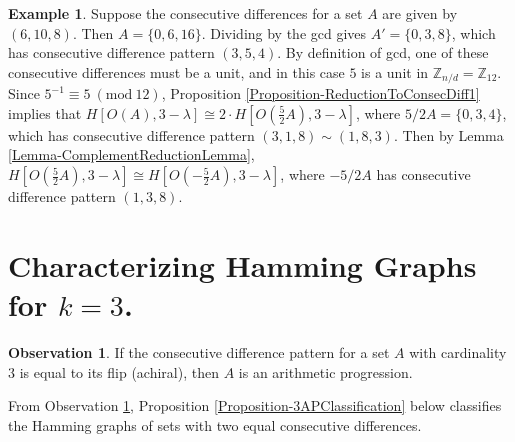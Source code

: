 \documentclass[12pt]{article}
\newcommand{\Z}{\mathbb{Z}}
\newcommand{\Mod}[1]{\ (\mathrm{mod}\ #1)}
\theoremstyle{definition}
\newtheorem{eg}{Example}
\newtheorem{obs}{Observation}
\begin{document}
	\begin{eg}
		Suppose the consecutive differences for a set $A$ are given by $(6,10,8)$.  Then $A = \{0, 6, 16\}$.  Dividing by the gcd gives $A' = \{0, 3, 8\}$, which has consecutive difference pattern $(3,5,4)$.   By definition of gcd, one of these consecutive differences must be a unit, and in this case $5$ is a unit in $\Z_{n/d} = \Z_{12}$.  Since $5^{-1} \equiv 5 \Mod{12}$, Proposition \ref{Proposition-ReductionToConsecDiff1} implies that $H[O(A),3-\lambda] \cong 2 \cdot H[O(\tfrac{5}{2}A), 3-\lambda]$, where $5/2A = \{0,3,4\}$, which has consecutive difference pattern $(3,1,8) \sim (1,8,3)$.  Then by Lemma \ref{Lemma-ComplementReductionLemma}, $H[O(\tfrac{5}{2}A), 3-\lambda] \cong H[O(-\tfrac{5}{2}A), 3-\lambda]$, where $-5/2A$ has consecutive difference pattern $(1,3,8)$.
	\end{eg}

	\section{Characterizing Hamming Graphs for $k=3$.}
	
	\begin{obs}\label{Observation-AchiralIffAPWhenk=3}
		If the consecutive difference pattern for a set $A$ with cardinality $3$ is equal to its flip (achiral), then $A$ is an arithmetic progression.
	\end{obs}

	From Observation \ref{Observation-AchiralIffAPWhenk=3}, Proposition \ref{Proposition-3APClassification} below classifies the Hamming graphs of sets with two equal consecutive differences.
	
\end{document}
